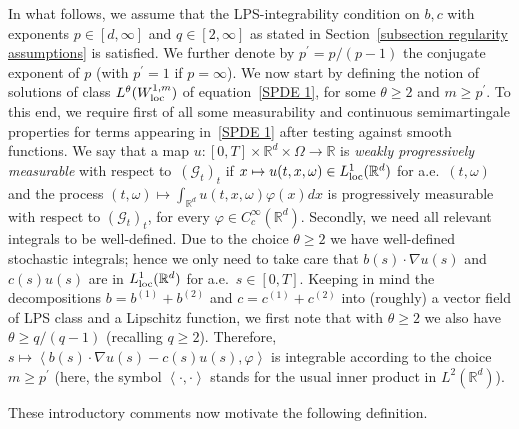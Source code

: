 \documentclass[a4paper,10pt]{article}
\newcommand\1{\mathbbm{1}}
\newcommand\loc{{\rm loc}}
\numberwithin{equation}{section}
\begin{document}
In what follows, we assume that the LPS-integrability condition on $b,c$ with exponents $p \in [d,\infty]$ and $q \in [2,\infty]$ as stated in Section~\ref{subsection regularity assumptions} is satisfied. We further denote by $p^{\prime}=p/(p-1)$ the conjugate exponent of $p$ (with $p^{\prime}=1$ if $p=\infty$). We now start by defining the notion of solutions of class $L^{\theta}(W_{\loc}^{1,m})$ of equation~\eqref{SPDE 1}, for some  $\theta\geq2$ and $m\geq p^{\prime}$. To this end, we require first of all some measurability and continuous semimartingale properties for terms appearing in~\eqref{SPDE 1} after testing against smooth functions. We say that a map $u \colon [0,T] \times \mathbb{R}^{d} \times \Omega \rightarrow \mathbb{R}$ is \emph{weakly progressively measurable} with respect to~$(\mathcal{G}_{t})_t$ if $x\mapsto u(t,x,\omega)  \in L_{\loc}^{1}(\mathbb{R}^{d})$ for a.e.~$(t,\omega)$ and the process $(t,\omega)  \mapsto \int_{\mathbb{R}^{d}} u(t,x,\omega) \varphi(x) dx$ is progressively measurable with respect to $(\mathcal{G}_{t})_t$, for every $\varphi\in C_{c}^{\infty}(\mathbb{R}^{d})$. Secondly, we need all relevant integrals to be well-defined. Due to the choice $\theta\geq2$ we have well-defined stochastic integrals; hence we only need to take care that $b(s) \cdot\nabla u(s)$ and $c(s) u(s)$ are in $L_{\loc}^{1}(\mathbb{R}^{d})$ for a.e.~$s \in [0,T]$. Keeping in mind the decompositions $b = b^{(1)} + b^{(2)}$ and $c = c^{(1)} + c^{(2)}$ into (roughly) a vector field of LPS class and a Lipschitz function, we first note that with $\theta\geq2$ we also have $\theta\geq q/(q-1)$ (recalling $q\geq2$). Therefore, $s\mapsto\left\langle b(s) \cdot\nabla u(s)-c(s)  u(s) ,\varphi\right\rangle $ is integrable according to the choice $m\geq p^{\prime}$ (here, the symbol $\left\langle \cdot,\cdot\right\rangle$ stands for the usual inner product in $L^{2}(\mathbb{R}^{d})$).

These introductory comments now motivate the following definition. 
\end{document}
